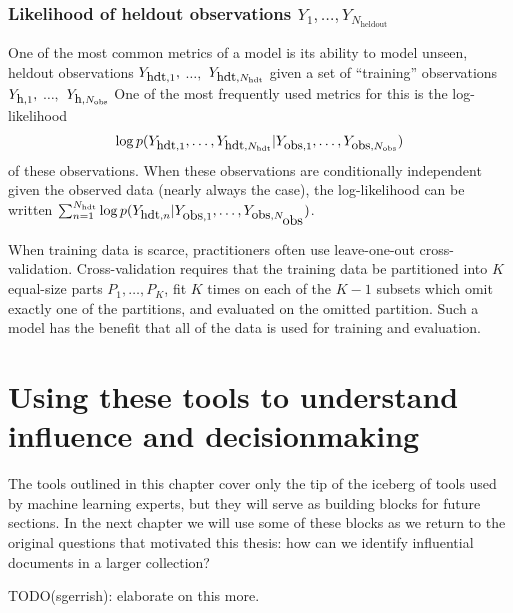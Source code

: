 \subsubsection{Likelihood of heldout observations $Y_1, \ldots, Y_{N_{\mbox{heldout}}}$}
One of the most common metrics of a model is its ability to model
unseen, heldout observations $Y_{\mbox{\small hdt},1},$ $\ldots,$
$Y_{\mbox{\small hdt},N_{\mbox{\tiny hdt}}}$ given a set of ``training''
  observations $Y_{\mbox{\small h},1},$ $\ldots,$ $Y_{\mbox{\small
      h},N_{\mbox{\tiny obs}}}$ One of the most frequently used metrics
    for this is the log-likelihood
\begin{align*}
  \log
  p(Y_{\mbox{\small hdt},1}, \ldots, Y_{\mbox{\small hdt},N_{\mbox{\tiny hdt}}}
  | Y_{\mbox{\small obs},1}, \ldots, Y_{\mbox{\small obs}, N_{\mbox{\tiny obs}}})
\end{align*}
of these observations. When these observations are conditionally
independent given the observed data (nearly always the case), the
log-likelihood can be written $\sum_{n=1}^{N_{\mbox{\tiny hdt}}} \log
  p(Y_{\mbox{\small hdt},n} | Y_{\mbox{obs},1}, \ldots, Y_{\mbox{\small obs},N_{\mbox{obs}}})$.

When training data is scarce, practitioners often use leave-one-out
cross-validation.  Cross-validation requires that the training data be
partitioned into $K$ equal-size parts $P_1, \ldots, P_K$, fit $K$
times on each of the $K - 1$ subsets which omit exactly one of the
partitions, and evaluated on the omitted partition.  Such a model has
the benefit that all of the data is used for training and evaluation.

\section{Using these tools to understand influence and decisionmaking}

The tools outlined in this chapter cover only the tip of the iceberg
of tools used by machine learning experts, but they will serve as
building blocks for future sections.  In the next chapter we will use
some of these blocks as we return to the original questions that
motivated this thesis: how can we identify influential documents in a
larger collection?

TODO(sgerrish): elaborate on this more.
